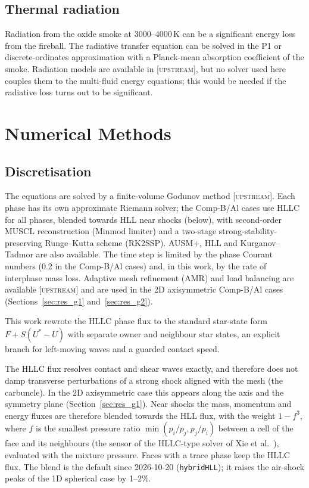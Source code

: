 \documentclass{article}
\newcommand{\up}{\textsc{[upstream]}}
\begin{document}
\subsection{Thermal radiation}
\label{sec:radiation}

Radiation from the oxide smoke at 3000--4000\,K can be a significant energy loss from the fireball. The radiative transfer equation can be solved in the P1 or discrete-ordinates approximation with a Planck-mean absorption coefficient of the smoke. Radiation models are available in  \up, but no solver used here couples them to the multi-fluid energy equations; this would be needed if the radiative loss turns out to be significant.

\section{Numerical Methods}
\label{sec:numerics}

\subsection{Discretisation}
\label{sec:discretisation}

The equations are solved by a finite-volume Godunov method \up. Each phase has its own approximate Riemann solver; the Comp-B/Al cases use HLLC \cite{toro} for all phases, blended towards HLL near shocks (below), with second-order MUSCL reconstruction (Minmod limiter) and a two-stage strong-stability-preserving Runge--Kutta scheme (RK2SSP). AUSM+, HLL and Kurganov--Tadmor are also available. The time step is limited by the phase Courant numbers (0.2 in the Comp-B/Al cases) and, in this work, by the rate of interphase mass loss. Adaptive mesh refinement (AMR) and load balancing are available \up{} and are used in the 2D axisymmetric Comp-B/Al cases (Sections~\ref{sec:res_g1} and~\ref{sec:res_g2}).

This work rewrote the HLLC phase flux to the standard star-state form $F + S(U^* - U)$ with separate owner and neighbour star states, an explicit branch for left-moving waves and a guarded contact speed.

The HLLC flux resolves contact and shear waves exactly, and therefore does not damp transverse perturbations of a strong shock aligned with the mesh (the carbuncle). In the 2D axisymmetric case this appears along the axis and the symmetry plane (Section~\ref{sec:res_g1}). Near shocks the mass, momentum and energy fluxes are therefore blended towards the HLL flux, with the weight $1 - f^3$, where $f$ is the smallest pressure ratio $\min(p_i/p_j, p_j/p_i)$ between a cell of the face and its neighbours (the sensor of the HLLC-type solver of Xie et al.\ \cite{xie2018}), evaluated with the mixture pressure. Faces with a trace phase keep the HLLC flux. The blend is the default since 2026-10-20 (\texttt{hybridHLL}); it raises the air-shock peaks of the 1D spherical case by 1--2\%.
\end{document}
